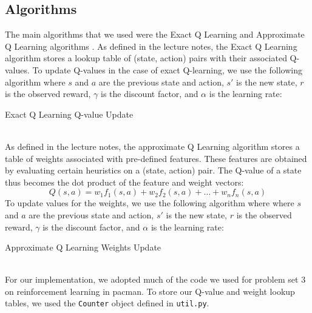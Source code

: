 \documentclass[11pt]{article}
\begin{document}
\subsection{Algorithms}
The main algorithms that we used were the Exact Q Learning and Approximate Q Learning algorithms \cite{CODE:3}. As defined in the lecture notes, the Exact Q Learning algorithm stores a lookup table of (state, action) pairs with their associated Q-values. To update Q-values in the case of exact Q-learning, we use the following algorithm where $s$ and $a$ are the previous state and action, $s'$ is the new state, $r$ is the observed reward, $\gamma$ is the discount factor, and $\alpha$ is the learning rate:
\begin{algorithm}
  \begin{algorithmic}
    \EndProcedure{}
  \end{algorithmic}
  \caption{Exact Q Learning Q-value Update}
\end{algorithm}\\
As defined in the lecture notes, the approximate Q Learning algorithm stores a table of weights associated with pre-defined features. These features are obtained by evaluating certain heuristics on a (state, action) pair. The Q-value of a state thus becomes the dot product of the feature and weight vectors:
$$Q(s,a) = w_1f_1(s,a) + w_2f_2(s,a) + \ldots + w_nf_n(s,a)$$
To update values for the weights, we use the following algorithm where where $s$ and $a$ are the previous state and action, $s'$ is the new state, $r$ is the observed reward, $\gamma$ is the discount factor, and $\alpha$ is the learning rate:
\begin{algorithm}
  \begin{algorithmic}
        \EndFor{}
    \EndProcedure{}
  \end{algorithmic}
  \caption{Approximate Q Learning Weights Update}
\end{algorithm}\\
For our implementation, we adopted much of the code we used for problem set 3 on reinforcement learning in pacman. To store our Q-value and weight lookup tables, we used the \texttt{Counter} object defined in \texttt{util.py}.
\end{document}
